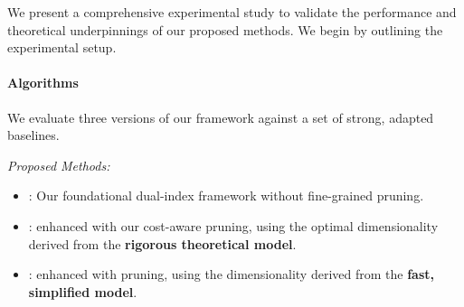 We present a comprehensive experimental study to validate the performance and theoretical underpinnings of our proposed methods. We begin by outlining the experimental setup.

\paragraph{Algorithms}
We evaluate three versions of our framework against a set of strong, adapted baselines.

\noindent\textit{Proposed Methods:}
\begin{itemize}[leftmargin=1.5em]
    \item \textbf{\dualtree}: Our foundational dual-index framework without fine-grained pruning.
    \item \textbf{\dualtreeopt}: \dualtree enhanced with our cost-aware pruning, using the optimal dimensionality derived from the \textbf{rigorous theoretical model}.
    \item \textbf{\dualtreefast}: \dualtree enhanced with pruning, using the dimensionality derived from the \textbf{fast, simplified model}.
\end{itemize}

